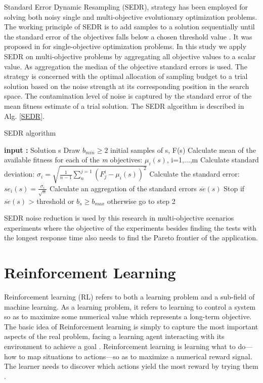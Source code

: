 \documentclass[espaco=umemeio,chapter=TITLE,twoside,openright]{abnt}
\begin{document}
Standard Error Dynamic Resampling (SEDR), strategy has been employed for solving both noisy single and multi-objective evolutionary
optimization problems. The working principle of SEDR is to add samples to a solution sequentially until the standard error of
the objectives falls below a chosen threshold value \cite{Siegmund2013}. It was proposed in \cite{DiPietro2004} for single-objective optimization problems. In this study we apply SEDR on multi-objective problems by aggregating all objective values to a scalar value. As aggregation the median of the objective standard errors is used. The strategy is concerned with the optimal allocation of sampling budget to a trial solution based on the noise strength at its corresponding position in the search space. The contamination level of noise is captured by the standard error of the mean fitness estimate of a trial solution. The SEDR algorithm is described in Alg. \ref{SEDR}.


\begin{algorithm}[h]
  \caption{SEDR algorithm \cite{Siegmund2013}}\label{SEDR}
  \begin{algorithmic}[1]

    \State \textbf{input :} Solution s
    \State Draw $b_{min}\ge 2$ initial samples of s, F(s)
    \State Calculate mean of the available fitness for each of the \textit{m} objectives: $\mu_{i}(s)$, i=1,...,m
    \State Calculate standard deviation: $\sigma_{i}=\sqrt{ \frac{1}{n-1} \sum_{n}^{j=1} (F^i_{j}-\mu_{i}(s))^2} $
    \State Calculate the standard error: $se_{i}(s)=\frac{\sigma_{i}}{\sqrt{n}}$
    \State Calculate an aggregation of the standard errors $\overline{se}(s)$
    \State Stop if  $\overline{se}(s)$ > threshold or $b_{s}\ge b_{max}$ otherwise go to step 2
  \end{algorithmic}
\end{algorithm}

SEDR noise reduction is used by this research in multi-objective scenarios experiments where the objective of the experiments besides finding the tests with the longest response time also needs to find the Pareto frontier of the application.


\section{Reinforcement Learning}

Reinforcement learning (RL) refers to both a learning problem and a sub-field of machine learning. As a learning problem, it refers to learning to control a system so as to maximize some numerical value which represents a long-term objective. The basic idea of Reinforcement learning  is simply to capture the most important aspects of the real problem, facing a learning agent interacting with its environment to achieve a goal \cite{Sutton2012}. Reinforcement learning is learning what to do—how to map situations to actions—so as to maximize a numerical reward signal. The learner needs to discover which actions yield the most reward by trying them \cite{Sutton2012}.
\end{document}
